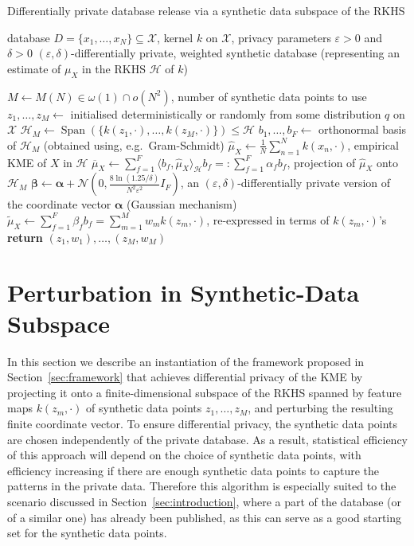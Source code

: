 \documentclass{article}
\newcommand{\calH}{\mathcal{H}}			%
\newcommand{\calN}{\mathcal{N}}			%
\newcommand{\calX}{\mathcal{X}}			%
\theoremstyle{plain}
\theoremstyle{remark}
\theoremstyle{definition}
\begin{document}
\begin{algorithm*}
	\caption{Differentially private database release via a synthetic data subspace of the RKHS}
	\label{alg:synthetic_subspace}
	\begin{algorithmic}[1]
		\REQUIRE database $D = \{ x_1, \ldots, x_N \} \subseteq \calX$, kernel $k$ on $\calX$, privacy parameters $\varepsilon > 0$ and $\delta > 0$
		\ENSURE $(\varepsilon, \delta)$-differentially private, weighted synthetic database (representing an estimate of $\mu_X$ in the RKHS $\calH$ of $k$)
		
		\STATE $M \gets M(N) \in \omega(1) \cap o(N^2)$, number of synthetic data points to use
		\STATE $z_1, \ldots, z_M \gets$ initialised deterministically or randomly from some distribution $q$ on $\calX$
		\STATE $\calH_M \gets \operatorname{Span}(\{ k(z_1, \cdot), \ldots, k(z_M, \cdot) \}) \leq \calH$
		\STATE $b_1, \ldots, b_F \gets$ orthonormal basis of $\calH_M$ (obtained using, e.g.~Gram-Schmidt)
		\STATE $\hat{\mu}_X \gets \frac{1}{N} \sum_{n = 1}^N k(x_n, \cdot)$, empirical KME of $X$ in $\calH$
		\STATE $\overline{\mu}_X \gets \sum_{f = 1}^F \langle b_f, \hat{\mu}_X \rangle_{\calH} b_f =: \sum_{f = 1}^F \alpha_f b_f$, projection of $\hat{\mu}_X$ onto $\calH_M$
		\STATE $\boldsymbol{\beta} \gets \boldsymbol{\alpha} + \calN(0, \frac{8 \ln(1.25/\delta)}{N^2 \varepsilon^2} I_F)$, an $(\varepsilon, \delta)$-differentially private version of the coordinate vector $\boldsymbol{\alpha}$ (Gaussian mechanism)
		\STATE $\tilde{\mu}_X \gets \sum_{f = 1}^F \beta_f b_f = \sum_{m = 1}^M w_m k(z_m, \cdot)$, re-expressed in terms of $k(z_m, \cdot)$'s \label{alg:synthetic_subspace:reexpress}
		\STATE \textbf{return} $(z_1, w_1), \ldots, (z_M, w_M)$
	\end{algorithmic}
\end{algorithm*}



\section{Perturbation in Synthetic-Data Subspace}
\label{sec:perturb_in_synthetic_subspace}

In this section we describe an instantiation of the framework proposed in Section~\ref{sec:framework} that achieves differential privacy of the KME by projecting it onto a finite-dimensional subspace of the RKHS spanned by feature maps $k(z_m, \cdot)$ of synthetic data points $z_1, \ldots, z_M$, and perturbing the resulting finite coordinate vector. To ensure differential privacy, the synthetic data points are chosen independently of the private database. As a result, statistical efficiency of this approach will depend on the choice of synthetic data points, with efficiency increasing if there are enough synthetic data points to capture the patterns in the private data. Therefore this algorithm is especially suited to the scenario discussed in Section~\ref{sec:introduction}, where a part of the database (or of a similar one) has already been published, as this can serve as a good starting set for the synthetic data points.
\end{document}
